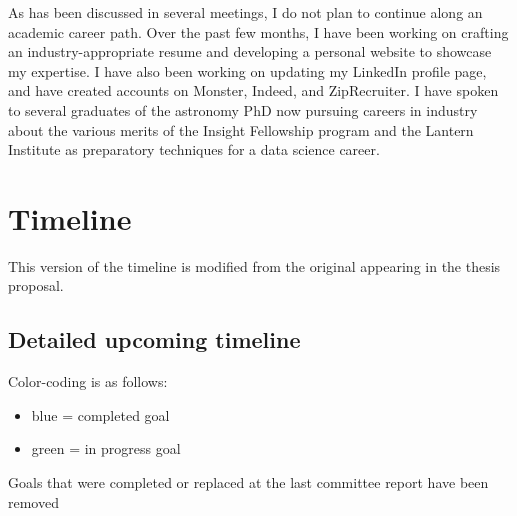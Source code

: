 \documentclass[11pt]{article}
\begin{document}
	As has been discussed in several meetings, I do not plan to continue along an academic career path. Over the past few months, I have been working on crafting an industry-appropriate resume and developing a personal website to showcase my expertise. I have also been working on updating my LinkedIn profile page, and have created accounts on Monster, Indeed, and ZipRecruiter. I have spoken to several graduates of the astronomy PhD now pursuing careers in industry about the various merits of the Insight Fellowship program and the Lantern Institute as preparatory techniques for a data science career.

\section*{Timeline}

This version of the timeline is modified from the original appearing in the thesis proposal. 

\subsection*{Detailed upcoming timeline}
Color-coding is as follows:
    
    \begin{itemize}
    	\item {\color{RoyalBlue}blue} = completed goal
    	\item {\color{ForestGreen} green} = in progress goal
    \end{itemize}

Goals that were completed or replaced at the last committee report have been removed
\end{document}
